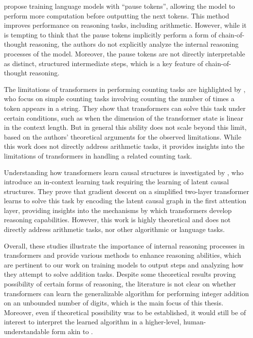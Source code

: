 \cite{goyal_think_2024} propose training language models with ``pause tokens'', allowing the model to perform more computation before outputting the next tokens. This method improves performance on reasoning tasks, including arithmetic. However, while it is tempting to think that the pause tokens implicitly perform a form of chain-of-thought reasoning, the authors do not explicitly analyze the internal reasoning processes of the model. Moreover, the pause tokens are not directly interpretable as distinct, structured intermediate steps, which is a key feature of chain-of-thought reasoning.

The limitations of transformers in performing counting tasks are highlighted by \cite{yehudai_when_2024}, who focus on simple counting tasks involving counting the number of times a token appears in a string. They show that transformers can solve this task under certain conditions, such as when the dimension of the transformer state is linear in the context length. But in general this ability does not scale beyond this limit, based on the authors' theoretical arguments for the observed limitations. While this work does not directly address arithmetic tasks, it provides insights into the limitations of transformers in handling a related counting task.

Understanding how transformers learn causal structures is investigated by \cite{nichani_how_2024}, who introduce an in-context learning task requiring the learning of latent causal structures. They prove that gradient descent on a simplified two-layer transformer learns to solve this task by encoding the latent causal graph in the first attention layer, providing insights into the mechanisms by which transformers develop reasoning capabilities. However, this work is highly theoretical and does not directly address arithmetic tasks, nor other algorithmic or language tasks.

Overall, these studies illustrate the importance of internal reasoning processes in transformers and provide various methods to enhance reasoning abilities, which are pertinent to our work on training models to output steps and analyzing how they attempt to solve addition tasks. Despite some theoretical results proving possibility of certain forms of reasoning, the literature is not clear on whether transformers can learn the generalizable algorithm for performing integer addition on an unbounded number of digits, which is the main focus of this thesis. Moreover, even if theoretical possibility was to be established, it would still be of interest to interpret the learned algorithm in a higher-level, human-understandable form akin to \cite{nanda_fourier}.

